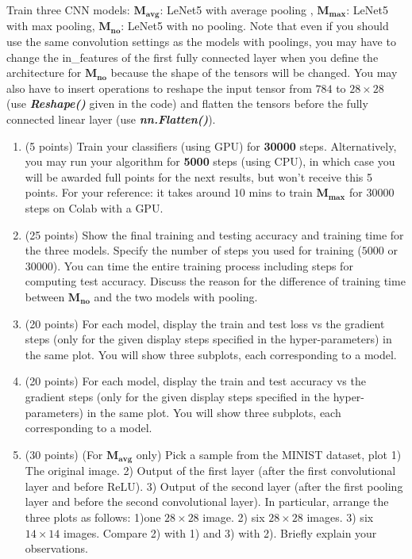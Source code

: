 \documentclass{article}
\begin{document}
Train three CNN models: $\bm{M_{avg}}$: LeNet5 with average pooling , $\bm{M_{max}}$: LeNet5 with max pooling, $\bm{M_{no}}$: LeNet5 with no pooling. Note that even if you should use the same convolution settings as the models with poolings, you may have to change the in\_features of the first fully connected layer when you define the architecture for $\bm{M_{no}}$ because the shape of the tensors will be changed. You may also have to insert operations to reshape the input tensor from $784$ to $28\times 28$ (use \textbf{\textit{Reshape()}} given in the code) and flatten the tensors before the fully connected linear layer (use \textbf{\textit{nn.Flatten()}}). 
\begin{enumerate}[a]

    \item (5 points) Train your classifiers (using GPU) for \textbf{30000} steps. Alternatively, you may run your algorithm for \textbf{5000} steps (using CPU), in which case you will be awarded full points for the next results, but won't receive this 5 points. For your reference: it takes around $10$ mins to train $\bm{M_{max}}$ for 30000 steps on Colab with a GPU.
    
    
    \item (25 points) Show the final training and testing accuracy and training time for the three models. Specify the number of steps you used for training ($5000$ or $30000$). You can time the entire training process including steps for computing test accuracy. Discuss the reason for the difference of training time between $\bm{M_{no}}$ and the two models with pooling.
    
    
    
    
    \item (20 points) For each model, display the train and test loss vs the gradient steps (only for the given display steps specified in the hyper-parameters) in the same plot. You will show three subplots, each corresponding to a model.

    \item (20 points) For each model, display the train and test accuracy vs the gradient steps (only for the given display steps specified in the hyper-parameters) in the same plot. You will show three subplots, each corresponding to a model.
    
    

    \item (30 points) (For $\bm{M_{avg}}$ only) Pick a sample from the MINIST dataset, plot 1) The original image. 2) Output of the first layer (after the first convolutional layer and before ReLU). 3) Output of the second layer (after the first pooling layer and before the second convolutional layer). In particular, arrange the three plots as follows: 1)one $28 \times 28$ image. 2) six $28 \times 28$ images. 3) six $14 \times 14$ images. Compare 2) with 1) and 3) with 2). Briefly explain your observations.
    
\end{enumerate}
\end{document}
